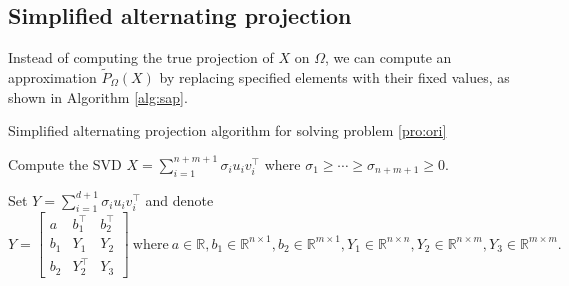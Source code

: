 \documentclass[smallextended, envcountsame]{svjour3}
\begin{document}
\subsection{Simplified alternating projection}
    Instead of computing the true projection of $X$ on $\Omega$, we can compute an approximation $\widetilde{P}_\Omega(X)$ by replacing specified elements with their fixed values, as shown in Algorithm \ref{alg:sap}.
    \begin{algorithm}[!htb]\caption{Simplified alternating projection algorithm for solving problem \eqref{pro:ori}}\label{alg:sap}
    \DontPrintSemicolon
        
        {  
            Compute the SVD $X=\sum\limits_{i=1}^{n+m+1}\sigma_iu_iv_i^\top$ where $\sigma_1\ge\cdots\ge\sigma_{n+m+1}\ge 0$.
            
            Set $Y=\sum\limits_{i=1}^{d+1}\sigma_iu_iv_i^\top$ and denote
            \begin{equation*}
                Y = \begin{bmatrix}
                    a & b_1^\top & b_2^\top\\
                    b_1 & Y_1 & Y_2\\
                    b_2 & Y_2^\top & Y_3
                \end{bmatrix}~\text{where}~a\in\mathbb{R},b_1\in\mathbb{R}^{n\times 1},b_2\in\mathbb{R}^{m\times 1}, Y_1\in\mathbb{R}^{n\times n}, Y_2\in\mathbb{R}^{n\times m}, Y_3\in\mathbb{R}^{m\times m}.
            \end{equation*}
            
}
\end{algorithm}
\end{document}

